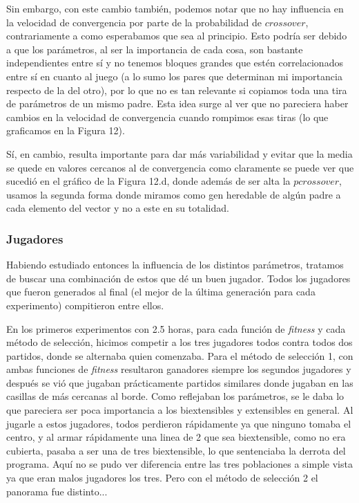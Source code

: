 \documentclass[A4paper,oneside,fleqn,11pt]{article}
\theoremstyle{definition}
\begin{document}
Sin embargo, con este cambio también, podemos notar que no hay influencia en la velocidad de convergencia por parte de la probabilidad de $crossover$, contrariamente a como esperabamos que sea al principio. Esto podría ser debido a que los parámetros, al ser la importancia de cada cosa, son bastante independientes entre sí y no tenemos bloques grandes que estén correlacionados entre sí en cuanto al juego (a lo sumo los pares que determinan mi importancia respecto de la del otro), por lo que no es tan relevante si copiamos toda una tira de parámetros de un mismo padre. Esta idea surge al ver que no pareciera haber cambios en la velocidad de convergencia cuando rompimos esas tiras (lo que graficamos en la Figura 12).

Sí, en cambio, resulta importante para dar más variabilidad y evitar que la media se quede en valores cercanos al de convergencia como claramente se puede ver que sucedió en el gráfico de la Figura 12.d, donde además de ser alta la $pcrossover$, usamos la segunda forma donde miramos como gen heredable de algún padre a cada elemento del vector y no a este en su totalidad.

\subsubsection{Jugadores}
Habiendo estudiado entonces la influencia de los distintos parámetros, tratamos de buscar una combinación de estos que dé un buen jugador. Todos los jugadores que fueron generados al final (el mejor de la última generación para cada experimento) compitieron entre ellos.

En los primeros experimentos con 2.5 horas, para cada función de \textit{fitness} y cada método de selección, hicimos competir a los tres jugadores todos contra todos dos partidos, donde se alternaba quien comenzaba. Para el método de selección 1, con ambas funciones de \textit{fitness} resultaron ganadores siempre los segundos jugadores y después se vió que jugaban prácticamente partidos similares donde jugaban en las casillas de más cercanas al borde. Como reflejaban los parámetros, se le daba lo que pareciera ser poca importancia a los biextensibles y extensibles en general. Al jugarle a estos jugadores, todos perdieron rápidamente ya que ninguno tomaba el centro, y al armar rápidamente una linea de 2 que sea biextensible, como no era cubierta, pasaba a ser una de tres biextensible, lo que sentenciaba la derrota del programa. Aquí no se pudo ver diferencia entre las tres poblaciones a simple vista ya que eran malos jugadores los tres. Pero con el método de selección 2 el panorama fue distinto...
\end{document}
